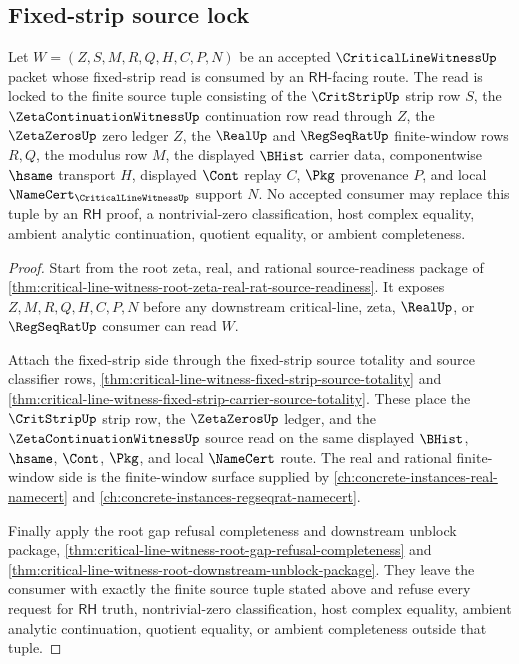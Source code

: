 \subsection{Fixed-strip source lock}

\begin{theorem}
\label{thm:critical-line-witness-fixed-strip-source-lock}
Let $W=(Z,S,M,R,Q,H,C,P,N)$ be an accepted $\CriticalLineWitnessUp$ packet whose fixed-strip read is consumed by an $\mathsf{RH}$-facing route. The read is locked to the finite source tuple consisting of the $\CritStripUp$ strip row $S$, the $\ZetaContinuationWitnessUp$ continuation row read through $Z$, the $\ZetaZerosUp$ zero ledger $Z$, the $\RealUp$ and $\RegSeqRatUp$ finite-window rows $R,Q$, the modulus row $M$, the displayed $\BHist$ carrier data, componentwise $\hsame$ transport $H$, displayed $\Cont$ replay $C$, $\Pkg$ provenance $P$, and local $\NameCert_{\CriticalLineWitnessUp}$ support $N$. No accepted consumer may replace this tuple by an $\mathsf{RH}$ proof, a nontrivial-zero classification, host complex equality, ambient analytic continuation, quotient equality, or ambient completeness.
\end{theorem}
\begin{proof}
Start from the root zeta, real, and rational source-readiness package of \autoref{thm:critical-line-witness-root-zeta-real-rat-source-readiness}. It exposes $Z,M,R,Q,H,C,P,N$ before any downstream critical-line, zeta, $\RealUp$, or $\RegSeqRatUp$ consumer can read $W$.

Attach the fixed-strip side through the fixed-strip source totality and source classifier rows, \autoref{thm:critical-line-witness-fixed-strip-source-totality} and \autoref{thm:critical-line-witness-fixed-strip-carrier-source-totality}. These place the $\CritStripUp$ strip row, the $\ZetaZerosUp$ ledger, and the $\ZetaContinuationWitnessUp$ source read on the same displayed $\BHist$, $\hsame$, $\Cont$, $\Pkg$, and local $\NameCert$ route. The real and rational finite-window side is the finite-window surface supplied by \autoref{ch:concrete-instances-real-namecert} and \autoref{ch:concrete-instances-regseqrat-namecert}.

Finally apply the root gap refusal completeness and downstream unblock package, \autoref{thm:critical-line-witness-root-gap-refusal-completeness} and \autoref{thm:critical-line-witness-root-downstream-unblock-package}. They leave the consumer with exactly the finite source tuple stated above and refuse every request for $\mathsf{RH}$ truth, nontrivial-zero classification, host complex equality, ambient analytic continuation, quotient equality, or ambient completeness outside that tuple.
\end{proof}
